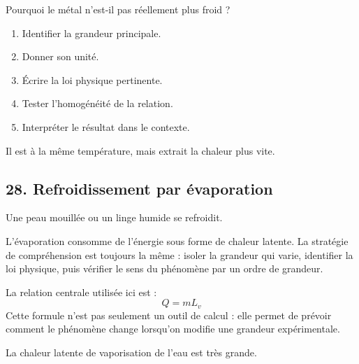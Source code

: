 \documentclass[11pt,a4paper]{article}
\begin{document}
\begin{exercicebox}
Pourquoi le métal n'est-il pas réellement plus froid ?
\begin{enumerate}
  \item Identifier la grandeur principale.
  \item Donner son unité.
  \item Écrire la loi physique pertinente.
  \item Tester l'homogénéité de la relation.
  \item Interpréter le résultat dans le contexte.
\end{enumerate}
\end{exercicebox}

\begin{corrigebox}[Indication]
Il est à la même température, mais extrait la chaleur plus vite.
\end{corrigebox}


\subsection{28. Refroidissement par évaporation}

\begin{exemplebox}
Une peau mouillée ou un linge humide se refroidit.
\end{exemplebox}

\begin{methodebox}
L'évaporation consomme de l'énergie sous forme de chaleur latente.
La stratégie de compréhension est toujours la même : isoler la grandeur qui varie, identifier la loi physique, puis vérifier le sens du phénomène par un ordre de grandeur.
\end{methodebox}

\begin{theorembox}
La relation centrale utilisée ici est :
\[
Q=mL_v
\]
Cette formule n'est pas seulement un outil de calcul : elle permet de prévoir comment le phénomène change lorsqu'on modifie une grandeur expérimentale.
\end{theorembox}

\begin{odgbox}
La chaleur latente de vaporisation de l'eau est très grande.
\end{odgbox}
\end{document}
